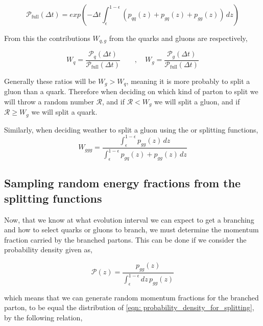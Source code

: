 \documentclass[main.tex]{subfiles}
\begin{document}
\begin{equation}\label{eqn: full_sudakov_splitting_interval_gluons&quarks} 
    \mathcal{P}_{\text{full}}(\Delta t) = exp\left(-\Delta t \int_\epsilon^{1-\epsilon}( p_{qq}(z) + p_{gq}(z) + p_{gg}(z) )\, dz \right) 
\end{equation}

From this the contributions \(W_{q,g}\) from the quarks and gluons are respectively, 

\begin{equation}\label{eqn: parton_selection_ratios}
    W_q = \frac{\mathcal{P}_{q}(\Delta t)}{\mathcal{P}_{\text{full}}(\Delta t)} \qquad , \quad 
    W_g = \frac{\mathcal{P}_{g}(\Delta t)}{\mathcal{P}_{\text{full}}(\Delta t)}
\end{equation}

Generally these ratios will be \(W_g > W_q\), meaning it is more probably to split a gluon than a quark. Therefore when deciding on which kind of parton to split we will throw a random number \(\mathcal{R}\), and if \(\mathcal{R} < W_g\) we will split a gluon, and if \(\mathcal{R} \geq W_g\) we will split a quark.

Similarly, when deciding weather to split a gluon using the \ggg or \gqq splitting functions,
\begin{equation}\label{eqn: gluon_splitting_selection_ratios}
    W_{ggg} = \frac{\int_\epsilon^{1-\epsilon} p_{gg}(z) \, dz}{\int_\epsilon^{1-\epsilon}p_{gq}(z) + p_{gg}(z) \, dz}
\end{equation}

\subsection{Sampling random energy fractions from the splitting functions}\label{sec: metropolis_hastings}
Now, that we know at what evolution interval we can expect to get a branching and how to select quarks or gluons to branch, we must determine the momentum fraction carried by the branched partons.
This can be done if we consider the probability density given as,

\begin{equation}\label{eqn: probability_density_for_splitting}
    \mathcal{P}(z) = \frac{ p_{gg}(z)}{\int_\epsilon^{1-\epsilon} dz \, p_{gg}(z)}
\end{equation}

which means that we can generate random momentum fractions for the branched parton, to be equal the distribution of \eqref{eqn: probability_density_for_splitting}, by the following relation,
\end{document}
